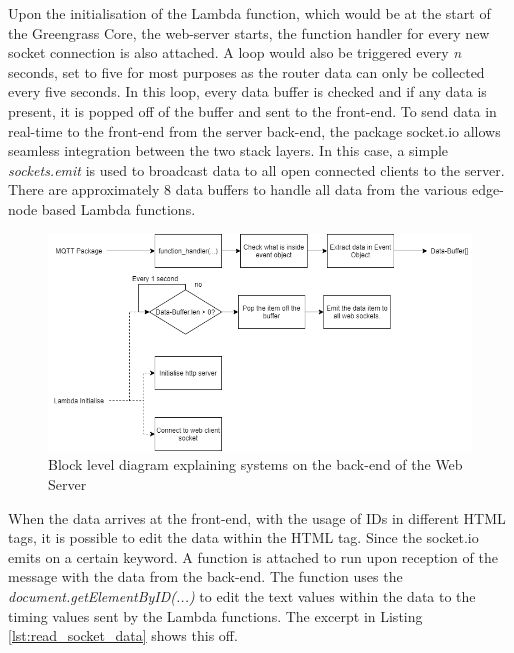 Upon the initialisation of the Lambda function, which would be at the start of the Greengrass Core, the web-server starts, the function handler for every new socket connection is also attached. A loop would also be triggered every \textit{n} seconds, set to five for most purposes as the router data can only be collected every five seconds. In this loop, every data buffer is checked and if any data is present, it is popped off of the buffer and sent to the front-end. To send data in real-time to the front-end from the server back-end, the package socket.io allows seamless integration between the two stack layers. In this case, a simple \textit{sockets.emit} is used to broadcast data to all open connected clients to the server. There are approximately 8  data buffers to handle all data from the various edge-node based Lambda functions.

\begin{figure}[ht]
    \centering
    \includegraphics[width=1\linewidth]{pages/Chapter4/Chapter 4 Images/node_web_app.png}
    \caption{Block level diagram explaining systems on the back-end of the Web Server}
    \label{fig:web_app_block_diagram.}
\end{figure}

When the data arrives at the front-end, with the usage of IDs in different HTML tags, it is possible to edit the data within the HTML tag. Since the socket.io emits on a certain keyword. A function is attached to run upon reception of the message with the data from the back-end. The function uses the \textit{document.getElementByID(...)} to edit the text values within the data to the timing values sent by the Lambda functions. The excerpt in Listing \ref{lst:read_socket_data} shows this off.

